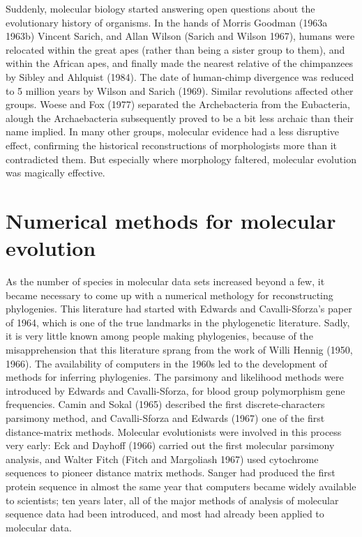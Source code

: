 \documentclass[12pt]{article}
\begin{document}
Suddenly, molecular biology started answering open questions about the
evolutionary history of organisms.  In the hands of Morris Goodman (1963a 1963b)
Vincent Sarich, and Allan Wilson (Sarich and Wilson 1967), humans were relocated within the great apes (rather than being a
sister group to them), and within the African apes, and finally made the
nearest relative of the chimpanzees by Sibley and Ahlquist (1984).  The date
of human-chimp divergence was reduced to 5 million years by Wilson and Sarich (1969).
Similar revolutions affected other groups.  Woese and Fox (1977) separated the
Archebacteria from the Eubacteria, alough the Archaebacteria subsequently proved to be
a bit less archaic than their name implied.  In many other groups, molecular
evidence had a less disruptive effect, confirming the historical reconstructions
of morphologists more than it contradicted them.  But especially where morphology
faltered, molecular evolution was magically effective.

\section*{Numerical methods for molecular evolution}

As the number of species in molecular data sets increased beyond a few, it became
necessary to come up with a numerical methology for reconstructing phylogenies.
This literature had started with Edwards and Cavalli-Sforza's paper of 1964, which is
one of the true landmarks in the phylogenetic literature.  Sadly, it is very little
known among people making phylogenies, because of the misapprehension that this
literature sprang from the work of Willi Hennig (1950, 1966).  The availability of
computers in the 1960s led to the development of methods for inferring
phylogenies. The parsimony and likelihood methods were introduced by Edwards and
Cavalli-Sforza, for blood group polymorphism gene frequencies.  Camin and Sokal (1965)
described the first discrete-characters parsimony method, and Cavalli-Sforza and
Edwards  (1967) one of the first distance-matrix methods.  Molecular evolutionists were involved in
this process very early: Eck and Dayhoff (1966) carried out the first molecular
parsimony analysis, and Walter Fitch (Fitch and Margoliash 1967) used cytochrome sequences to pioneer distance
matrix methods.  Sanger had produced the first protein sequence in
almost the same year that computers became widely available to scientists; ten years
later, all of the major methods of analysis of molecular sequence data had been
introduced, and most had already been applied to molecular data.
\end{document}
